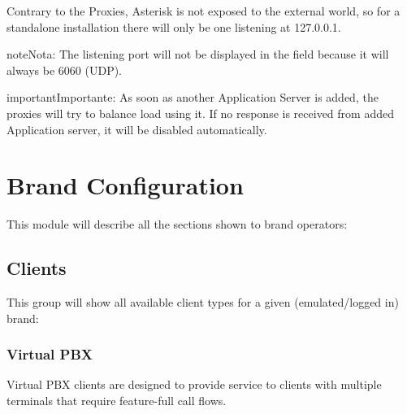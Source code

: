 \documentclass[letterpaper,10pt,spanish]{sphinxmanual}
\begin{document}
Contrary to the Proxies, Asterisk is not exposed to the external world, so
for a standalone installation there will only be one listening at 127.0.0.1.

\begin{notice}{note}{Nota:}
The listening port will not be displayed in the field because it will
always be 6060 (UDP).
\end{notice}

\begin{notice}{important}{Importante:}
As soon as another Application Server is added, the proxies will
try to balance load using it. If no response is received from added
Application server, it will be disabled automatically.
\end{notice}


\chapter{Brand Configuration}
\label{administration_portal/brand/index::doc}\label{administration_portal/brand/index:brand-configuration}
This module will describe all the sections shown to brand operators:


\section{Clients}
\label{administration_portal/brand/clients/index:clients}\label{administration_portal/brand/clients/index::doc}
This group will show all available client types for a given (emulated/logged in) brand:


\subsection{Virtual PBX}
\label{administration_portal/brand/clients/virtual_pbx::doc}\label{administration_portal/brand/clients/virtual_pbx:virtual-pbx}
Virtual PBX clients are designed to provide service to clients with multiple terminals
that require feature-full call flows.
\end{document}
